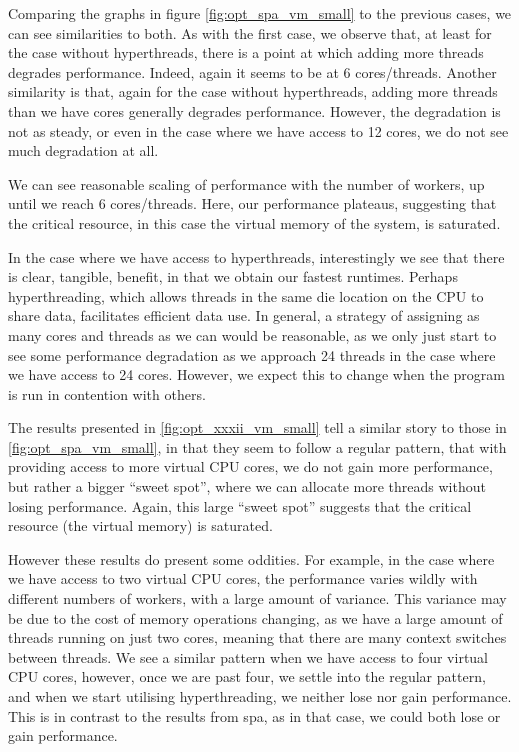 Comparing the graphs in figure \ref{fig:opt_spa_vm_small} to the previous cases, we can see similarities to both. As with the first case, we observe that, at least for the case without hyperthreads, there is a point at which adding more threads degrades performance. Indeed, again it seems to be at 6 cores/threads. Another similarity is that, again for the case without hyperthreads, adding more threads than we have cores generally degrades performance. However, the degradation is not as steady, or even in the case where we have access to 12 cores, we do not see much degradation at all.

We can see reasonable scaling of performance with the number of workers, up until we reach 6 cores/threads. Here, our performance plateaus, suggesting that the critical resource, in this case the virtual memory of the system, is saturated.

In the case where we have access to hyperthreads, interestingly we see that there is clear, tangible, benefit, in that we obtain our fastest runtimes. Perhaps hyperthreading, which allows threads in the same die location on the CPU to share data, facilitates efficient data use. In general, a strategy of assigning as many cores and threads as we can would be reasonable, as we only just start to see some performance degradation as we approach 24 threads in the case where we have access to 24 cores. However, we expect this to change when the program is run in contention with others.



The results presented in \ref{fig:opt_xxxii_vm_small} tell a similar story to those in \ref{fig:opt_spa_vm_small}, in that they seem to follow a regular pattern, that with providing access to more virtual CPU cores, we do not gain more performance, but rather a bigger ``sweet spot'', where we can allocate more threads without losing performance. Again, this large ``sweet spot'' suggests that the critical resource (the virtual memory) is saturated.

However these results do present some oddities. For example, in the case where we have access to two virtual CPU cores, the performance varies wildly with different numbers of workers, with a large amount of variance. This variance may be due to the cost of memory operations changing, as we have a large amount of threads running on just two cores, meaning that there are many context switches between threads. We see a similar pattern when we have access to four virtual CPU cores, however, once we are past four, we settle into the regular pattern, and when we start utilising hyperthreading, we neither lose nor gain performance. This is in contrast to the results from spa, as in that case, we could both lose or gain performance.



